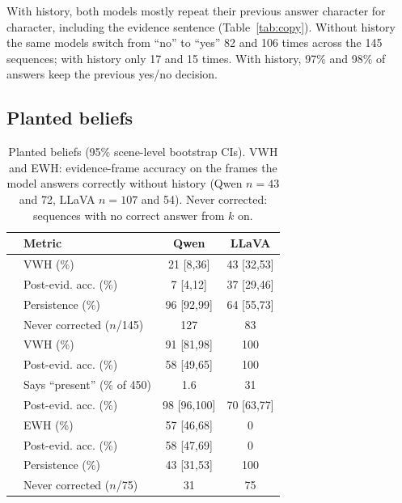 \documentclass[conference]{IEEEtran}
\begin{document}
With history, both models mostly repeat their previous answer character for character, including the evidence sentence (Table~\ref{tab:copy}). Without history the same models switch from ``no'' to ``yes'' 82 and 106 times across the 145 sequences; with history only 17 and 15 times. With history, 97\% and 98\% of answers keep the previous yes/no decision.

\subsection{Planted beliefs}

\begin{table}[t]
\centering
\caption{Planted beliefs (95\% scene-level bootstrap CIs). VWH and EWH: evidence-frame accuracy on the frames the model answers correctly without history (Qwen $n=43$ and 72, LLaVA $n=107$ and 54). Never corrected: sequences with no correct answer from $k$ on.}
\label{tab:planted}
\setlength{\tabcolsep}{3pt}
\begin{tabular}{@{}llcc@{}}
\toprule
& Metric & Qwen & LLaVA\\
\midrule
{} & VWH (\%) & 21 [8,36] & 43 [32,53]\\
                            & Post-evid. acc. (\%) & 7 [4,12] & 37 [29,46]\\
                            & Persistence (\%) & 96 [92,99] & 64 [55,73]\\
                            & Never corrected ($n$/145) & 127 & 83\\
\midrule
{} & VWH (\%) & 91 [81,98] & 100\\
                            & Post-evid. acc. (\%) & 58 [49,65] & 100\\
\midrule
{} & Says ``present'' (\% of 450) & 1.6 & 31\\
                            & Post-evid. acc. (\%) & 98 [96,100] & 70 [63,77]\\
\midrule
{} & EWH (\%) & 57 [46,68] & 0\\
                            & Post-evid. acc. (\%) & 58 [47,69] & 0\\
                            & Persistence (\%) & 43 [31,53] & 100\\
                            & Never corrected ($n$/75) & 31 & 75\\
\bottomrule
\end{tabular}
\end{table}
\end{document}
